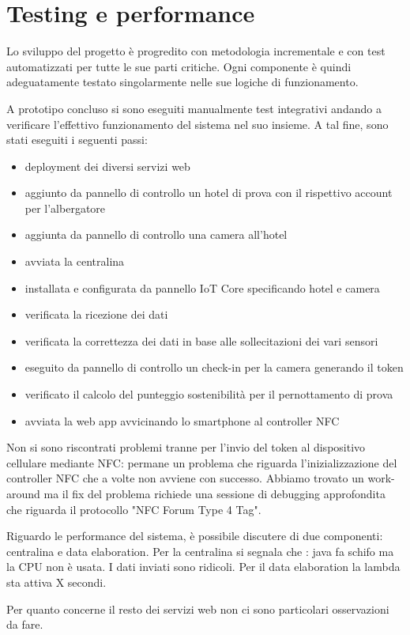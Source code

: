 

\section{Testing e performance}

Lo sviluppo del progetto è progredito con metodologia incrementale e con test automatizzati per tutte le sue parti critiche. 
Ogni componente è quindi adeguatamente testato singolarmente nelle sue logiche di funzionamento.

A prototipo concluso si sono eseguiti manualmente test integrativi andando a verificare l'effettivo funzionamento del sistema nel suo insieme.
A tal fine, sono stati eseguiti i seguenti passi:
\begin{itemize}
    \item deployment dei diversi servizi web
    \item aggiunto da pannello di controllo un hotel di prova con il rispettivo account per l'albergatore
    \item aggiunta da pannello di controllo una camera all'hotel
    \item avviata la centralina
    \item installata e configurata da pannello IoT Core specificando hotel e camera
    \item verificata la ricezione dei dati 
    \item verificata la correttezza dei dati in base alle sollecitazioni dei vari sensori
    \item eseguito da pannello di controllo un check-in per la camera generando il token
    \item verificato il calcolo del punteggio sostenibilità per il pernottamento di prova
    \item avviata la web app avvicinando lo smartphone al controller NFC
\end{itemize}

Non si sono riscontrati problemi tranne per l'invio del token al dispositivo cellulare mediante NFC: 
permane un problema che riguarda l'inizializzazione del controller NFC che a volte non avviene con successo. 
Abbiamo trovato un work-around ma il fix del problema richiede una sessione di debugging approfondita che riguarda il protocollo "NFC Forum Type 4 Tag".

Riguardo le performance del sistema, è possibile discutere di due componenti: centralina e data elaboration.
Per la centralina si segnala che : java fa schifo ma la CPU non è usata. I dati inviati sono ridicoli.
Per il data elaboration la lambda sta attiva X secondi.

Per quanto concerne il resto dei servizi web non ci sono particolari osservazioni da fare.

\newpage